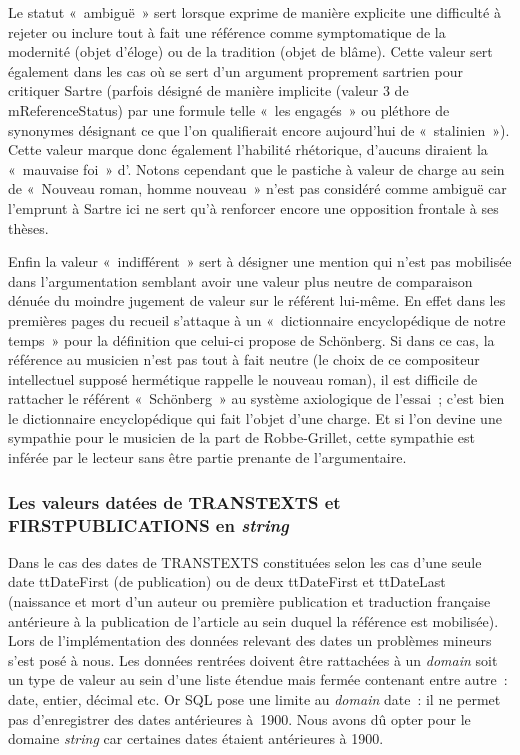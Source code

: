 Le statut «~ambiguë~» sert lorsque \robbe{} exprime de manière explicite une difficulté à rejeter ou inclure tout à fait une référence comme symptomatique de la modernité (objet d'éloge) ou de la tradition (objet de blâme). Cette valeur sert également dans les cas où \robbe{} se sert d'un argument proprement sartrien pour critiquer Sartre (parfois désigné de manière implicite (valeur 3 de mReferenceStatus) par une formule telle «~les engagés~» ou pléthore de synonymes désignant ce que l'on qualifierait encore aujourd'hui de «~stalinien~»). Cette valeur marque donc également l'habilité rhétorique, d'aucuns diraient la «~mauvaise foi~» d'\robbe{}. Notons cependant que le pastiche à valeur de charge au sein de «~Nouveau roman, homme nouveau~» n'est pas considéré comme ambiguë car l'emprunt à Sartre ici ne sert qu'à renforcer encore une opposition frontale à ses thèses.

Enfin la valeur «~indifférent~» sert à désigner une mention qui n'est pas mobilisée dans l'argumentation semblant avoir une valeur plus neutre de comparaison dénuée du moindre jugement de valeur sur le référent lui-même. En effet dans les premières pages du recueil \robbe{} s'attaque à un «~dictionnaire encyclopédique de notre temps~» pour la définition que celui-ci propose de Schönberg. Si dans ce cas, la référence au musicien n'est pas tout à fait neutre (le choix de ce compositeur intellectuel supposé hermétique rappelle le nouveau roman), il est difficile de rattacher le référent «~Schönberg~» au système axiologique de l'essai~; c'est bien le dictionnaire encyclopédique qui fait l'objet d'une charge. Et si l'on devine une sympathie pour le musicien de la part de Robbe-Grillet, cette sympathie est inférée par le lecteur sans être partie prenante de l'argumentaire.


\subsubsection{Les valeurs datées de TRANSTEXTS et FIRSTPUBLICATIONS en \textit{string}}
Dans le cas des dates de TRANSTEXTS constituées selon les cas d'une seule date ttDateFirst (de publication) ou de deux ttDateFirst et ttDateLast (naissance et mort d'un auteur ou première publication et traduction française antérieure à la publication de l'article au sein duquel la référence est mobilisée). Lors de l'implémentation des données relevant des dates un problèmes mineurs s'est posé à nous. Les données rentrées doivent être rattachées à un \textit{domain} soit un type de valeur au sein d'une liste étendue mais fermée contenant entre autre~: date, entier, décimal etc. Or SQL pose une limite au \textit{domain} date~: il ne permet pas d'enregistrer des dates antérieures à~1900. Nous avons dû opter pour le domaine \textit{string} car certaines dates étaient antérieures à 1900.

